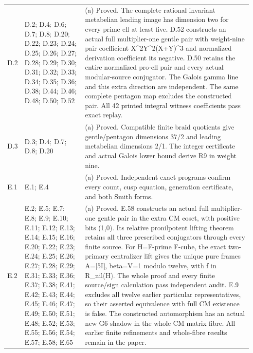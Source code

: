 \begin{longtable}{@{}p{1.1cm}p{3.0cm}p{10.3cm}@{}}
D.2 & D.2; D.4; D.6; D.7; D.8; D.20; D.22; D.23; D.24; D.25; D.26; D.27; D.28; D.29; D.30; D.31; D.32; D.33; D.34; D.35; D.36; D.38; D.44; D.46; D.48; D.50; D.52 & (a) Proved. The complete rational invariant metabelian leading image has dimension two for every prime ell at least five. D.52 constructs an actual full multiplier-one gentle pair with weight-nine pair coefficient X\textasciicircum{}2Y\textasciicircum{}2(X+Y)\textasciicircum{}3 and normalized derivation coefficient its negative. D.50 retains the entire normalized pro-ell pair and every actual modular-source conjugator. The Galois gamma line and this extra direction are independent. The same complete pentagon map excludes the constructed pair. All 42 printed integral witness coefficients pass exact replay. \\
D.3 & D.3; D.4; D.7; D.8; D.20 & (a) Proved. Compatible finite braid quotients give gentle/pentagon dimensions 37/2 and leading metabelian dimensions 2/1. The integer certificate and actual Galois lower bound derive R9 in weight nine. \\
E.1 & E.1; E.4 & (a) Proved. Independent exact programs confirm every count, cusp equation, generation certificate, and both Smith forms. \\
E.2 & E.2; E.5; E.7; E.8; E.9; E.10; E.11; E.12; E.13; E.14; E.15; E.16; E.20; E.22; E.23; E.24; E.25; E.26; E.27; E.28; E.29; E.31; E.33; E.36; E.37; E.38; E.41; E.42; E.43; E.44; E.45; E.46; E.47; E.49; E.50; E.51; E.48; E.52; E.53; E.55; E.56; E.54; E.57; E.58; E.65 & (a) Proved. E.58 constructs an actual full multiplier-one gentle pair in the extra CM coset, with positive bits (1,0). Its relative pronilpotent lifting theorem retains all three prescribed conjugators through every finite source. For H=F-prime F-cube, the exact two-primary centralizer lift gives the unique pure frames A=[5I], beta=V=1 modulo twelve, with f in R\_nil(H). The whole proof and every finite source/sign calculation pass independent audit. E.9 excludes all twelve earlier particular representatives, so their asserted equivalence with full CM existence is false. The constructed automorphism has an actual new G6 shadow in the whole CM matrix fibre. All earlier finite refinements and whole-fibre results remain in the paper. \\

\end{longtable}
